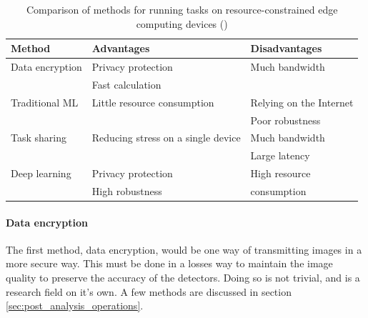 \begin{table}[H]
    \centering
    \renewcommand{\arraystretch}{1.5} %
    \setlength{\tabcolsep}{1em}
    \begin{tabular}{|l|l|l|}
        \hline
        \rowcolor{gray!25}
        \textbf{Method} & \textbf{Advantages}                & \textbf{Disadvantages}  \\ \hline
        Data encryption & Privacy protection                 & Much bandwidth          \\
                        & Fast calculation                   &                         \\ \hline
        Traditional ML  & Little resource consumption        & Relying on the Internet \\
                        &                                    & Poor robustness         \\ \hline
        Task sharing    & Reducing stress on a single device & Much bandwidth          \\
                        &                                    & Large latency           \\ \hline
        Deep learning   & Privacy protection                 & High resource           \\
                        & High robustness                    & consumption             \\ \hline
    \end{tabular}
    \caption{\centering Comparison of methods for running tasks on resource-constrained
        edge computing devices (\cite{hu2022accurateobjectdetectionatedge})}
    \label{tab:methods_to_run_tasks}
\end{table}

\paragraph{Data encryption}
The first method, data encryption, would be one way of transmitting images in a more secure way. This must be done in a losses way to maintain the image quality to preserve the accuracy of the detectors. Doing so is not trivial, and is a research field on it's own. A few methods are discussed in section \ref{sec:post_analysis_operations}.

